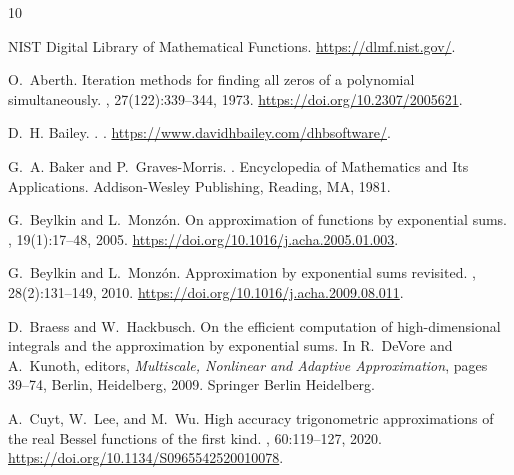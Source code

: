 \documentclass[12pt]{article}
\begin{document}
%
%

\begin{thebibliography}{10}

{NIST Digital Library of Mathematical Functions}.
\newblock \url{https://dlmf.nist.gov/}.

O.~Aberth.
\newblock Iteration methods for finding all zeros of a polynomial
  simultaneously.
, 27(122):339--344, 1973.
\newblock \url{https://doi.org/10.2307/2005621}.

D.~H. Bailey.
.
.
\newblock \url{https://www.davidhbailey.com/dhbsoftware/}.

G.~A. Baker and P.~Graves-Morris.
.
\newblock Encyclopedia of Mathematics and Its Applications. Addison-Wesley
  Publishing, Reading, MA, 1981.

G.~Beylkin and L.~Monz\'on.
\newblock On approximation of functions by exponential sums.
, 19(1):17--48,
  2005.
\newblock \url{https://doi.org/10.1016/j.acha.2005.01.003}.

G.~Beylkin and L.~Monz\'on.
\newblock Approximation by exponential sums revisited.
, 28(2):131--149,
  2010.
\newblock \url{https://doi.org/10.1016/j.acha.2009.08.011}.

D.~Braess and W.~Hackbusch.
\newblock On the efficient computation of high-dimensional integrals and the
  approximation by exponential sums.
\newblock In R.~DeVore and A.~Kunoth, editors, {\em Multiscale, Nonlinear and
  Adaptive Approximation}, pages 39--74, Berlin, Heidelberg, 2009. Springer
  Berlin Heidelberg.

A.~Cuyt, W.~Lee, and M.~Wu.
\newblock High accuracy trigonometric approximations of the real {B}essel
  functions of the first kind.
,
  60:119--127, 2020.
\newblock \url{https://doi.org/10.1134/S0965542520010078}.


\end{thebibliography}
\end{document}
